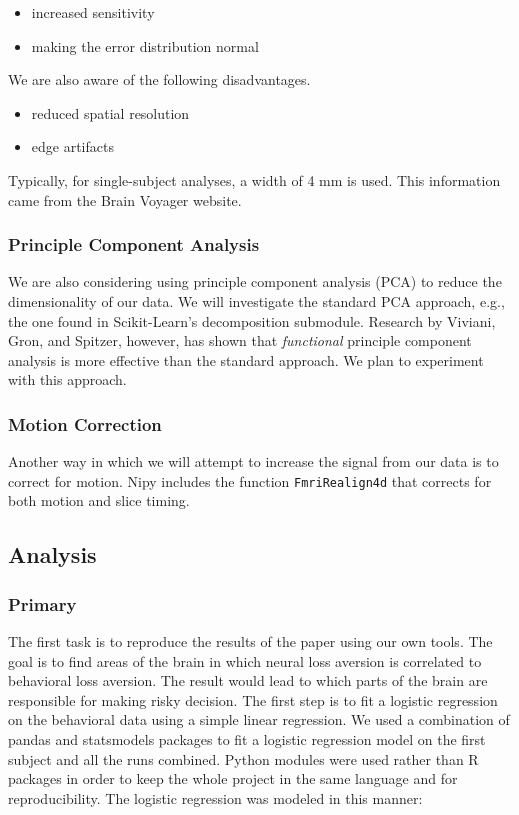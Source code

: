 \documentclass[11pt]{article}
\begin{document}
\begin{itemize}
  \item increased sensitivity
  \item making the error distribution normal
\end{itemize}

We are also aware of the following disadvantages.

\begin{itemize}
  \item{reduced spatial resolution}
  \item{edge artifacts}
\end{itemize}

Typically, for single-subject analyses, a width of 4 mm is used. This
information came from the Brain Voyager website\cite{bvsmoothing}.

\subsubsection{Principle Component Analysis}

We are also considering using principle component analysis (PCA) to reduce the
dimensionality of our data. We will investigate the standard PCA approach,
e.g., the one found in Scikit-Learn's decomposition submodule. Research by
Viviani, Gron, and Spitzer\cite{viviani}, however, has shown that
\textit{functional} principle component analysis is more effective than the
standard approach. We plan to experiment with this approach.

\subsubsection{Motion Correction}

Another way in which we will attempt to increase the signal from our data is to
correct for motion. Nipy includes the function \texttt{FmriRealign4d} that
corrects for both motion and slice timing.

\subsection{Analysis}

\subsubsection{Primary}

The first task is to reproduce the results of the paper using our own tools.
The goal is to find areas of the brain in which neural loss aversion is
correlated to behavioral loss aversion. The result would lead to which parts of
the brain are responsible for making risky decision. The first step is to fit a
logistic regression on the behavioral data using a simple linear regression. We
used a combination of pandas and statsmodels packages to fit a logistic
regression model on the first subject and all the runs combined. Python modules
were used rather than R packages in order to keep the whole project in the same
language and for reproducibility. The logistic regression was modeled in this
manner:
\end{document}
